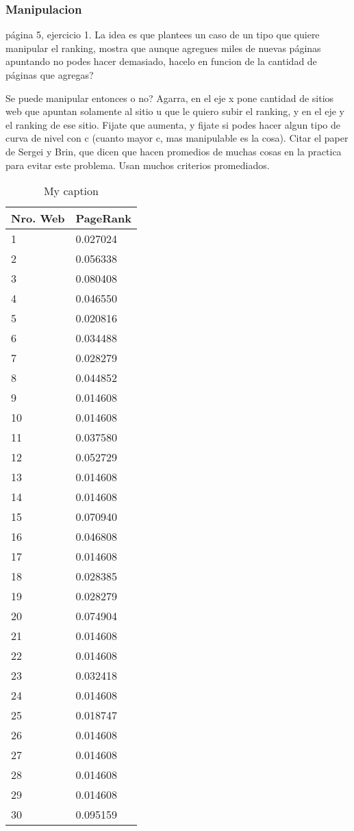 \subsubsection{Manipulacion}
página 5, ejercicio 1. La idea es que plantees un caso de un tipo que quiere manipular el ranking, mostra que aunque agregues miles de nuevas páginas apuntando no podes hacer demasiado, hacelo en funcion de la cantidad de páginas que agregas?

Se puede manipular entonces o no? Agarra, en el eje x pone cantidad de sitios web que apuntan solamente al sitio u que le quiero subir el ranking, y en el eje y el ranking de ese sitio. Fijate que aumenta, y fijate si podes hacer algun tipo de curva de nivel con c (cuanto mayor c, mas manipulable es la cosa). Citar el paper de Sergei y Brin, que dicen que hacen promedios de muchas cosas en la practica para evitar este problema. Usan muchos criterios promediados.

\begin{table}[H]
\centering
\caption{My caption}
\label{my-label}
\begin{tabular}{ll}
\hline
Nro. Web & PageRank \\ \hline
1        & 0.027024 \\
2        & 0.056338 \\
3        & 0.080408 \\
4        & 0.046550 \\
5        & 0.020816 \\
6        & 0.034488 \\
7        & 0.028279 \\
8        & 0.044852 \\
9        & 0.014608 \\
10       & 0.014608 \\
11       & 0.037580 \\
12       & 0.052729 \\
13       & 0.014608 \\
14       & 0.014608 \\
15       & 0.070940 \\
16       & 0.046808 \\
17       & 0.014608 \\
18       & 0.028385 \\
19       & 0.028279 \\
20       & 0.074904 \\
21       & 0.014608 \\
22       & 0.014608 \\
23       & 0.032418 \\
24       & 0.014608 \\
25       & 0.018747 \\
26       & 0.014608 \\
27       & 0.014608 \\
28       & 0.014608 \\
29       & 0.014608 \\
30       & 0.095159 \\ \hline
\end{tabular}
\end{table}

